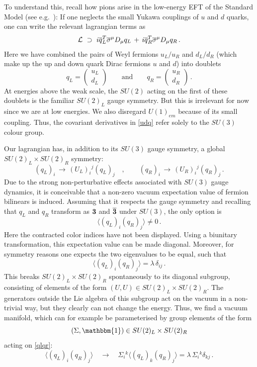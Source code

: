 \documentclass[12pt]{article}
\newcommand{\be}{\begin{equation}}
\newcommand{\ee}{\end{equation}}
\newcommand{\ol}{\overline}
\numberwithin{equation}{section}
\begin{document}
To understand this, recall how pions arise in the low-energy EFT of the Standard Model (see e.g.~\cite{Cheng:1985bj, Peskin:1995ev, Weinberg:1995mt, Donoghue:1992dd, Kaplan:2005es}): If one neglects the small Yukawa couplings of $u$ and $d$ quarks, one can write the relevant lagrangian terms as 
\be
{\cal L}\,\,\supset\,\, i\ol{q}_L^T\ol{\sigma}^\mu D_\mu q_L \,+\, i\ol{q}_R^T\ol{\sigma}^\mu D_\mu q_R\,.
\label{udq}
\ee
Here we have combined the pairs of Weyl fermions $u_L/u_R$ and $d_L/d_R$ (which make up the up and down quark Dirac fermions $u$ and $d$) into doublets
\be
q_L=\left(\begin{array}{c} u_L \\ d_L \end{array} \right) \qquad \mbox{and} \qquad 
q_R=\left(\begin{array}{c} u_R \\ d_R \end{array} \right)\,.
\ee
At  energies above the weak scale, the $SU(2)$ acting on the first of these doublets is the familiar $SU(2)_L$ gauge symmetry. But this is irrelevant for now since we are at low energies. We also  disregard $U(1)_{em}$ because of its small coupling. Thus, the covariant derivatives in \eqref{udq} refer solely to the $SU(3)$ colour group.

Our lagrangian has, in addition to its $SU(3)$ gauge symmetry, a global $SU(2)_L\times SU(2)_R$ symmetry:
\be
(q_L)_i\,\to\, (U_L)_i{}^j(q_L)_j\quad,\qquad
(q_R)_i\,\to\, (U_R)_i{}^j(q_R)_j\,.
\ee
Due to the strong non-perturbative effects associated with $SU(3)$ gauge dynamics, it is conceivable that a non-zero vacuum expectation value of fermion bilinears is induced. Assuming that it respects the gauge symmetry and recalling that $q_L$ and $q_R$ transform as ${\bf 3}$ and ${\bf \ol{3}}$ under $SU(3)$, the only option is
\be
\langle (q_L)_i (q_R)_j\rangle \neq 0\,.
\ee
Here the contracted color indices have not been displayed.
Using a biunitary transformation, this expectation value can be made diagonal. Moreover, for symmetry reasons one expects the two eigenvalues to be equal, such that
\be
\langle (q_L)_i (q_R)_j\rangle =\lambda\,\delta_{ij}\,.
\label{qlqr}
\ee
This breaks $SU(2)_L\times SU(2)_R$ spontaneously to its diagonal subgroup, consisting of elements of the form $(U,U)\in SU(2)_L\times SU(2)_R$. The generators outside the Lie algebra of this subgroup act on the vacuum in a non-trivial way, but they clearly can not change the energy. Thus, we find a vacuum manifold, which can for example be parameterised by group elements of the form
\be
(\Sigma,\mathbbm{1})\in SU(2)_L\times SU(2)_R
\ee
acting on \eqref{qlqr}:
\be
\langle (q_L)_i (q_R)_j\rangle\quad\to\quad
\Sigma_i{}^k\langle (q_L)_k (q_R)_j\rangle =\lambda\,\Sigma_i{}^k\delta_{kj}\,.
\ee
\end{document}
